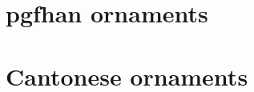 \documentclass[a4paper, 10pt, openany]{book}
\begin{document}
\sloppy
\jcz{}



\part{pgfhan ornaments}






\part{Cantonese ornaments}






\end{document}
